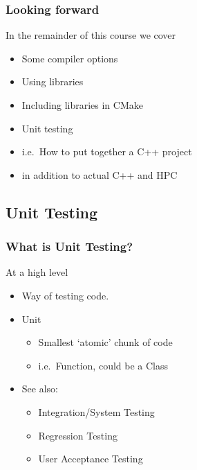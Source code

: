 \hypertarget{looking-forward}{%
\subsubsection{Looking forward}\label{looking-forward}}

In the remainder of this course we cover

\begin{itemize}
\tightlist
\item
  Some compiler options
\item
  Using libraries
\item
  Including libraries in CMake
\item
  Unit testing
\item
  i.e.~How to put together a C++ project
\item
  in addition to actual C++ and HPC
\end{itemize}

\hypertarget{unit-testing}{%
\subsection{Unit Testing}\label{unit-testing}}

\hypertarget{what-is-unit-testing}{%
\subsubsection{What is Unit Testing?}\label{what-is-unit-testing}}

At a high level

\begin{itemize}
\tightlist
\item
  Way of testing code.
\item
  Unit

  \begin{itemize}
  \tightlist
  \item
    Smallest `atomic' chunk of code
  \item
    i.e.~Function, could be a Class
  \end{itemize}
\item
  See also:

  \begin{itemize}
  \tightlist
  \item
    Integration/System Testing
  \item
    Regression Testing
  \item
    User Acceptance Testing
  \end{itemize}
\end{itemize}

